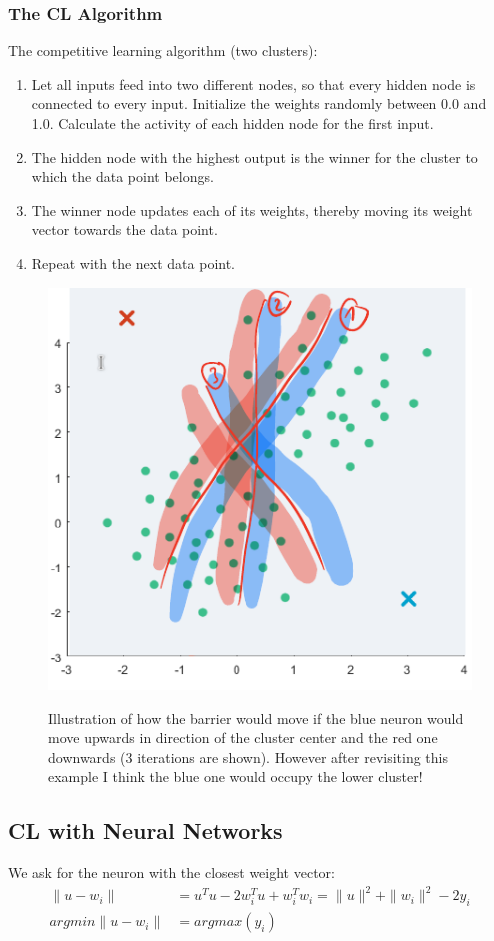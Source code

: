 \documentclass[main]{subfiles}
\begin{document}
\subsubsection{The CL Algorithm}
The competitive learning algorithm (two clusters):
\begin{enumerate}
    \item Let all inputs feed into two different nodes, so that every hidden node is connected to every input. Initialize the weights randomly between 0.0 and 1.0. Calculate the activity of each hidden node for the first input.
    \item The hidden node with the highest output is the winner for the cluster to which the data point belongs.
    \item The winner node updates each of its weights, thereby moving its weight vector towards the data point.
    \item Repeat with the next data point.
\end{enumerate}

\begin{figure}[H]
	\centering
	\includegraphics[width=0.5\linewidth]{07_UnsupervisedAndSelfsupervisedLearning/figures/competitive-barrier.png}
	\label{fig:competitive-barrier}
	\caption{Illustration of how the barrier would move if the blue neuron would move upwards in direction of the cluster center and the red one downwards (3 iterations are shown). However after revisiting this example I think the blue one would occupy the lower cluster!}
\end{figure}

\subsection{CL with Neural Networks}

We ask for the neuron with the closest weight vector:
\begin{align} 
    \| u-w_i \| &= u^Tu - 2 w_i^Tu + w_i^Tw_i = \| u \|^2 + \| w_i \|^2 - 2y_i \\
    argmin \| u-w_i \| &= argmax (y_i)
\end{align}
\end{document}
